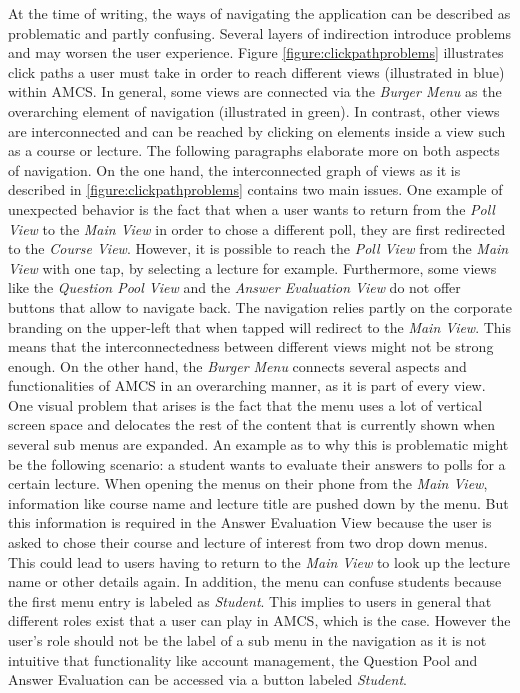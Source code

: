 At the time of writing, the ways of navigating the application can be described as problematic and partly confusing. Several layers of indirection introduce problems and may worsen the user experience.
Figure \autoref{figure:clickpathproblems} illustrates click paths a user must take in order to reach different views (illustrated in blue) within AMCS. In general, some views are connected via the \emph{Burger Menu} as the overarching element of navigation (illustrated in green). In contrast, other views are interconnected and can be reached by clicking on elements inside a view such as a course or lecture. The following paragraphs elaborate more on both aspects of navigation.
\newline
\newline
On the one hand, the interconnected graph of views as it is described in \autoref{figure:clickpathproblems} contains two main issues. One example of unexpected behavior is the fact that when a user wants to return from the \emph{Poll View} to the \emph{Main View} in order to chose a different poll, they are first redirected to the \emph{Course View}. However, it is possible to reach the \emph{Poll View} from the \emph{Main View} with one tap, by selecting a lecture for example. Furthermore, some views like the \emph{Question Pool View} and the \emph{Answer Evaluation View} do not offer buttons that allow to navigate back. The navigation relies partly on the corporate branding on the upper-left that when tapped will redirect to the \emph{Main View}.
This means that the interconnectedness between different views might not be strong enough.
\newline
\newline
On the other hand, the \emph{Burger Menu} connects several aspects and functionalities of AMCS in an overarching manner, as it is part of every view.  
One visual problem that arises is the fact that the menu uses a lot of vertical screen space and delocates the rest of the content that is currently shown when several sub menus are expanded. An example as to why this is problematic might be the following scenario: a student wants to evaluate their answers to polls for a certain lecture. When opening the menus on their phone from the \emph{Main View}, information like course name and lecture title are pushed down by the menu. But this information is required in the Answer Evaluation View because the user is asked to chose their course and lecture of interest from two drop down menus. This could lead to users having to return to the \emph{Main View} to look up the lecture name or other details again.
In addition, the menu can confuse students because the first menu entry is labeled as \emph{Student}. This implies to users in general that different roles exist that a user can play in AMCS, which is the case. However the user's role should not be the label of a sub menu in the navigation as it is not intuitive that functionality like account management, the Question Pool and Answer Evaluation can be accessed via a button labeled \emph{Student}.

